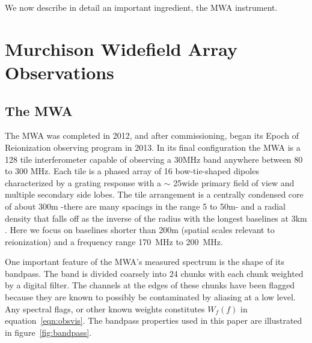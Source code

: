 \documentclass[preprint2,iop,numberedappendix]{emulateapj}
\begin{document}
We now describe in detail an important ingredient, the MWA instrument.

\section{Murchison Widefield Array Observations}\label{sec:instrument}
\subsection{The MWA}
The MWA was completed in 2012, and after commissioning, began its Epoch of Reionization observing program  in 2013.  In its final configuration the MWA is a 128 tile interferometer capable of observing a 30MHz band anywhere between 80 to 300 MHz.  Each tile is a phased array of 16 bow-tie-shaped dipoles characterized by a grating response with a $\sim$ 25\arcdeg wide primary field of view and multiple secondary side lobes. The tile arrangement is a centrally condensed core of about 300m -there are many spacings in the range 5 to 50m- and a radial density that falls off as the inverse of the radius with the longest baselines at 3km \citep{bea12}. Here we focus on baselines shorter than 200m (spatial scales relevant to reionization) and a frequency range 170~MHz to 200~MHz.

One important feature of the MWA's measured spectrum is the shape of its bandpass. The band is divided coarsely into 24 chunks with each chunk weighted by a digital filter. The channels at the edges of these chunks have been flagged because they are known to possibly be contaminated by aliasing at a low level.  Any spectral flags, or other known weights constitutes $W_f(f)$ in equation~\ref{eqn:obsvis}. The bandpass properties used in this paper are illustrated in figure~\ref{fig:bandpass}. 
\end{document}
